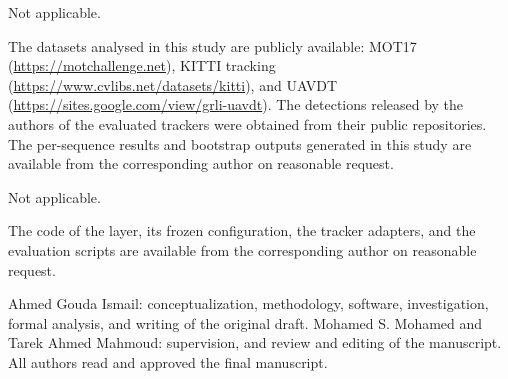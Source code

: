 \documentclass[pdflatex,sn-mathphys-num,iicol]{sn-jnl}
\begin{document}
Not applicable.

The datasets analysed in this study are publicly available: MOT17
(\url{https://motchallenge.net}), KITTI tracking (\url{https://www.cvlibs.net/datasets/kitti}), and UAVDT
(\url{https://sites.google.com/view/grli-uavdt}).
The detections released by the authors of the evaluated trackers were obtained from their public
repositories. The per-sequence results and bootstrap outputs generated in this study are available
from the corresponding author on reasonable request.

Not applicable.

The code of the layer, its frozen configuration, the tracker adapters, and the evaluation scripts
are available from the corresponding author on reasonable request.

Ahmed Gouda Ismail: conceptualization, methodology, software, investigation, formal analysis, and
writing of the original draft. Mohamed S. Mohamed and Tarek Ahmed Mahmoud: supervision, and
review and editing of the manuscript. All authors read and approved the final manuscript.

\end{document}
